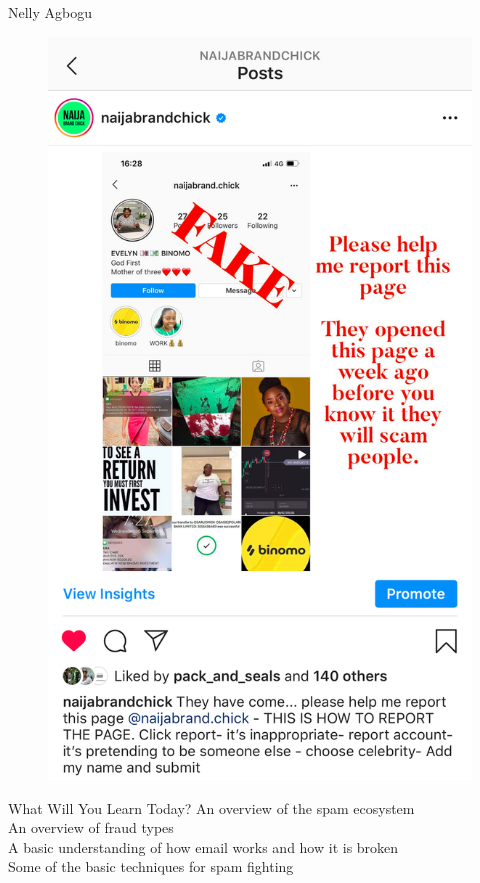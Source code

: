 \documentclass[nobackground,dvipsnames,table,aspectratio=169]{beamer}
\begin{document}
\begin{frame}{Nelly Agbogu}
    \begin{figure}
        \centering
        \includegraphics[height=0.85\textheight]{nelly-agbogu}
    \end{figure}
\end{frame}

\begin{frame}{What Will You Learn Today?}
    An overview of the spam ecosystem\\
    An overview of fraud types\\
    A basic understanding of how email works and how it is broken\\
    Some of the basic techniques for spam fighting
\end{frame}
\end{document}
